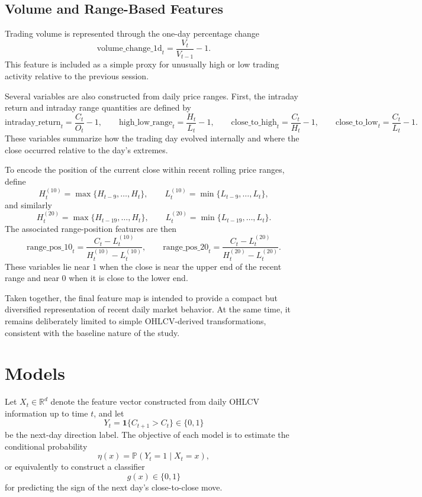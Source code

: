\documentclass[11pt,a4paper]{article}
\begin{document}
	\subsection{Volume and Range-Based Features}
	
	Trading volume is represented through the one-day percentage change
	\[
	\text{volume\_change\_1d}_t = \frac{V_t}{V_{t-1}} - 1.
	\]
	This feature is included as a simple proxy for unusually high or low trading activity relative to the previous session.
	
	Several variables are also constructed from daily price ranges. First, the intraday return and intraday range quantities are defined by
	\[
	\text{intraday\_return}_t = \frac{C_t}{O_t} - 1,
	\qquad
	\text{high\_low\_range}_t = \frac{H_t}{L_t} - 1,
	\qquad
	\text{close\_to\_high}_t = \frac{C_t}{H_t} - 1,
	\qquad
	\text{close\_to\_low}_t = \frac{C_t}{L_t} - 1.
	\]
	These variables summarize how the trading day evolved internally and where the close occurred relative to the day's extremes.
	
	To encode the position of the current close within recent rolling price ranges, define
	\[
	H^{(10)}_t = \max\{H_{t-9},\dots,H_t\},
	\qquad
	L^{(10)}_t = \min\{L_{t-9},\dots,L_t\},
	\]
	and similarly
	\[
	H^{(20)}_t = \max\{H_{t-19},\dots,H_t\},
	\qquad
	L^{(20)}_t = \min\{L_{t-19},\dots,L_t\}.
	\]
	The associated range-position features are then
	\[
	\text{range\_pos\_10}_t = \frac{C_t - L^{(10)}_t}{H^{(10)}_t - L^{(10)}_t},
	\qquad
	\text{range\_pos\_20}_t = \frac{C_t - L^{(20)}_t}{H^{(20)}_t - L^{(20)}_t}.
	\]
	These variables lie near \(1\) when the close is near the upper end of the recent range and near \(0\) when it is close to the lower end.
	
	Taken together, the final feature map is intended to provide a compact but diversified representation of recent daily market behavior. At the same time, it remains deliberately limited to simple OHLCV-derived transformations, consistent with the baseline nature of the study.
	
	\section{Models}
	
	Let \(X_t \in \mathbb{R}^d\) denote the feature vector constructed from daily OHLCV information up to time \(t\), and let
	\[
	Y_t = \mathbf{1}\{C_{t+1} > C_t\} \in \{0,1\}
	\]
	be the next-day direction label. The objective of each model is to estimate the conditional probability
	\[
	\eta(x) = \mathbb{P}(Y_t = 1 \mid X_t = x),
	\]
	or equivalently to construct a classifier
	\[
	g(x) \in \{0,1\}
	\]
	for predicting the sign of the next day's close-to-close move.
	
\end{document}
